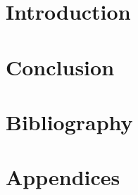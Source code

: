\documentclass{article}
\title{\TITLE}
\date{\DATE}
\author{
  Patrick Gadd \\
  \code{s113491} \\ \\
  Markus Færevaag \\
  \code{s123692}
}
\begin{document}
\maketitle
\pagebreak

\tableofcontents
\clearpage

\section{Introduction}
\label{sec:intro}


\section{Conclusion}
\label{sec:conclusion}

\clearpage

\section{Bibliography}
\label{sec:biblio}

\clearpage

\section{Appendices}
\label{sec:appendix}

\end{document}
